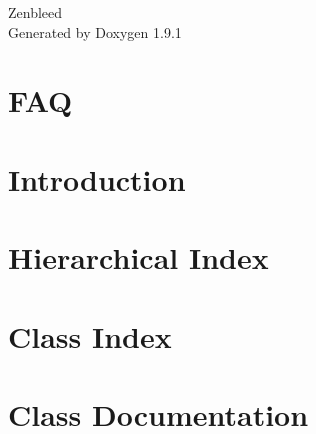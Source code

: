 \let\mypdfximage\pdfximage\def\pdfximage{\immediate\mypdfximage}\documentclass[twoside]{book}
\newcommand{\+}{\discretionary{\mbox{\scriptsize$\hookleftarrow$}}{}{}}
\newcommand{\clearemptydoublepage}{%
  \newpage{\pagestyle{empty}\cleardoublepage}%
}
\begin{document}
\raggedbottom

\hypersetup{pageanchor=false,
             bookmarksnumbered=true,
             pdfencoding=unicode
            }
\begin{titlepage}
\vspace*{7cm}
\begin{center}%
{\Large Zenbleed }\\
\vspace*{1cm}
{\large Generated by Doxygen 1.9.1}\\
\end{center}
\end{titlepage}
\clearemptydoublepage
{}
\tableofcontents
\clearemptydoublepage
{}
\hypersetup{pageanchor=true}

\chapter{FAQ}
\label{md_doc_custom_pages__f_a_q}

\chapter{Introduction}
\label{md_doc_custom_pages__user_manual}

\chapter{Hierarchical Index}

\chapter{Class Index}

\chapter{Class Documentation}







\backmatter
\newpage
{}
\clearemptydoublepage
{}
\printindex
\end{document}
